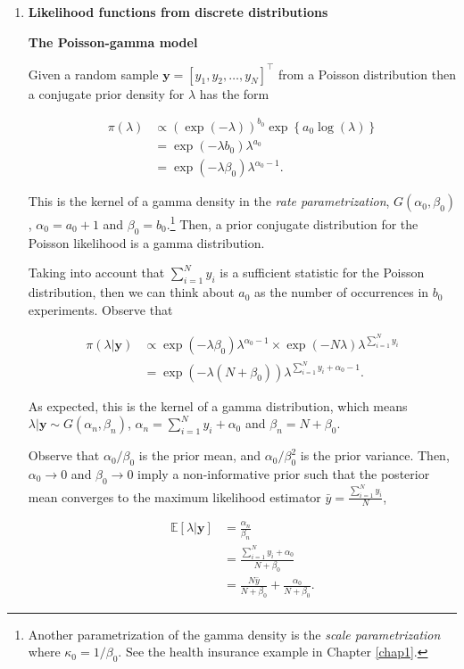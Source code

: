 \begin{enumerate}
	\item \textbf{Likelihood functions from discrete distributions}

\textbf{The Poisson-gamma model}

Given a random sample $\mathbf{y}=[y_1,y_2,\dots,y_N]^{\top}$ from a Poisson distribution then a conjugate prior density for $\lambda$ has the form 

\begin{align}
	\pi(\lambda)&\propto \left(\exp(-\lambda)\right)^{b_0} \exp\left\{a_0\log(\lambda)\right\}\nonumber\\
	& = \exp(-\lambda b_0) \lambda^{a_0}\nonumber\\
	& = \exp(-\lambda \beta_0) \lambda^{\alpha_0-1}.\nonumber
\end{align}

This is the kernel of a gamma density in the \textit{rate parametrization}, $G(\alpha_0,\beta_0)$, $\alpha_0=a_0+1$ and $\beta_0=b_0$.\footnote{Another parametrization of the gamma density is the \textit{scale parametrization} where $\kappa_0=1/\beta_0$. See the health insurance example in Chapter \ref{chap1}.} Then, a prior conjugate distribution for the Poisson likelihood is a gamma distribution.   

Taking into account that $\sum_{i=1}^N y_i$ is a sufficient statistic for the Poisson distribution, then we can think about $a_0$ as the number of occurrences in $b_0$ experiments. 
Observe that

\begin{align}
	\pi(\lambda|\mathbf{y})&\propto \exp(-\lambda \beta_0) \lambda^{\alpha_0-1} \times \exp(-N\lambda)\lambda^{\sum_{i=1}^Ny_i}\nonumber\\
	&= \exp(-\lambda(N+\beta_0)) \lambda^{\sum_{i=1}^Ny_i+\alpha_0-1}.\nonumber 
\end{align}

As expected, this is the kernel of a gamma distribution, which means $\lambda|\mathbf{y}\sim G(\alpha_n,\beta_n)$, $\alpha_n=\sum_{i=1}^Ny_i+\alpha_0$ and $\beta_n=N+\beta_0$.

Observe that $\alpha_0/\beta_0$ is the prior mean, and $\alpha_0/\beta_0^2$ is the prior variance. Then, $\alpha_0\rightarrow 0$ and $\beta_0\rightarrow 0$ imply a non-informative prior such that the posterior mean converges to the maximum likelihood estimator $\bar{y}=\frac{\sum_{i=1}^N y_i}{N}$,

\begin{align}
	\mathbb{E}\left[\lambda|\mathbf{y}\right]&=\frac{\alpha_n}{\beta_n}\nonumber\\
	&=\frac{\sum_{i=1}^Ny_i+\alpha_0}{N+\beta_0}\nonumber\\
	&=\frac{N\bar{y}}{N+\beta_0}+\frac{\alpha_0}{N+\beta_0}.\nonumber
\end{align}


\end{enumerate}

